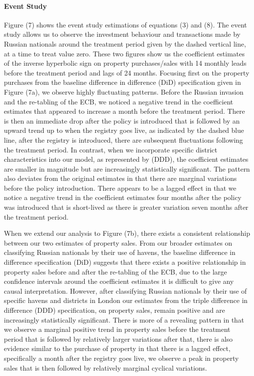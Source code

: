 \documentclass{article}
\begin{document}
\paragraph{Event Study}  Figure (7) shows the event study estimations of equations (3) and (8). The event study allows us to observe the investment behaviour and transactions made by Russian nationals around the treatment period given by the dashed vertical line, at a time to treat value zero. These two figures show us the coefficient estimates of the inverse hyperbolic sign on property purchases/sales with 14 monthly leads before the treatment period and lags of 24 months. Focusing first on the property purchases from the baseline difference in difference (DiD) specification given in Figure (7a), we observe highly fluctuating patterns. Before the Russian invasion and the re-tabling of the ECB, we noticed a negative trend in the coefficient estimates that appeared to increase a month before the treatment period. There is then an immediate drop after the policy is introduced that is followed by an upward trend up to when the registry goes live, as indicated by the dashed blue line, after the registry is introduced, there are subsequent fluctuations following the treatment period. In contrast, when we incorporate specific district characteristics into our model, as represented by (DDD), the coefficient estimates are smaller in magnitude but are increasingly statistically significant. The pattern also deviates from the original estimates in that there are marginal variations before the policy introduction. There appears to be a lagged effect in that we notice a negative trend in the coefficient estimates four months after the policy was introduced that is short-lived as there is greater variation seven months after the treatment period.  

When we extend our analysis to Figure (7b), there exists a consistent relationship between our two estimates of property sales. From our broader estimates on classifying Russian nationals by their use of havens, the baseline difference in difference specification (DiD) suggests that there exists a positive relationship in property sales before and after the re-tabling of the ECB, due to the large confidence intervals around the coefficient estimates it is difficult to give any causal interpretation. However, after classifying Russian nationals by their use of specific havens and districts in London our estimates from the triple difference in difference (DDD) specification, on property sales, remain positive and are increasingly statistically significant. There is more of a revealing pattern in that we observe a marginal positive trend in property sales before the treatment period that is followed by relatively larger variations after that, there is also evidence similar to the purchase of property in that there is a lagged effect, specifically a month after the registry goes live, we observe a peak in property sales that is then followed by relatively marginal cyclical variations.
\end{document}
